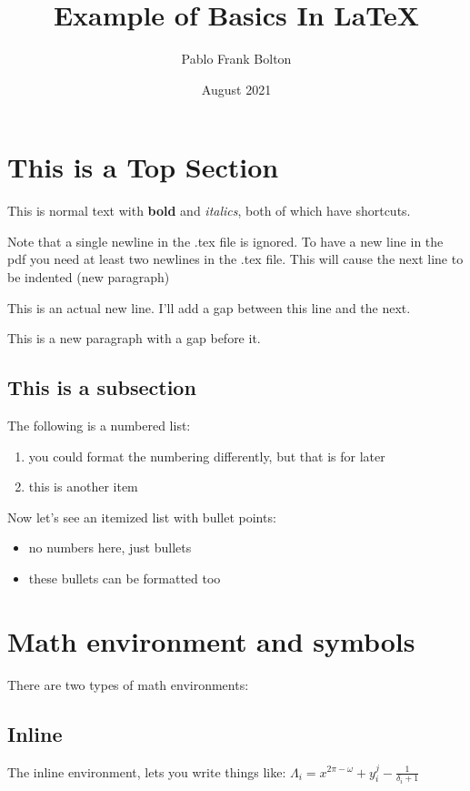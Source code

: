 \documentclass[]{article}
\title{Example of Basics In LaTeX}
\author{Pablo Frank Bolton}
\date{August 2021}
\begin{document}
\maketitle

\section{This is a Top Section}

This is normal text with \textbf{bold} and \textit{italics}, both of which have shortcuts.

Note that a single newline in the .tex file is ignored. 
To have a new line in the pdf you need at least two newlines in the .tex file. This will cause the next line to be indented (new paragraph)


This is an actual new line. I'll add a gap between this line and the next.

\medskip

This is a new paragraph with a gap before it.


\subsection{This is a subsection}

The following is a numbered list:
\begin{enumerate}
    \item you could format the numbering differently, but that is for later
    \item this is another item
\end{enumerate}

Now let's see an itemized list with bullet points:

\begin{itemize}
    \item no numbers here, just bullets
    \item these bullets can be formatted too
\end{itemize}


\section{Math environment and symbols}

There are two types of math environments:

\subsection{Inline}
The inline environment, lets you write things like: \( \Lambda_{i} = x^{2\pi-\omega} + y^{j}_{i} - \frac{1}{\delta_i + 1} \)
\end{document}
